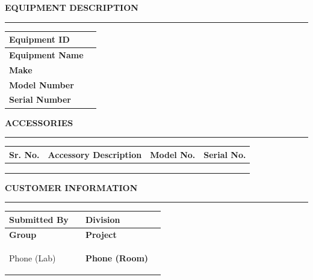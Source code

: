 \documentclass[a4paper,10pt]{article}
\newcommand{\sectiontitle}[1]
{
\vspace{2mm}

{\large\bfseries #1}

\vspace{0.5mm}

\hrule

\vspace{1.5mm}
}
\begin{document}
\sectiontitle{EQUIPMENT DESCRIPTION}

\begin{tabularx}{\textwidth}{|>{\bfseries}l|X|}
\hline
Equipment ID & \\[1mm]
\hline
Equipment Name & \\[1mm]
\hline
Make & \\[1mm]
\hline
Model Number & \\[1mm]
\hline
Serial Number & \\[1mm]
\hline
\end{tabularx}

\vspace{2mm}


\sectiontitle{ACCESSORIES}

\begin{tabularx}{\textwidth}
{|c|X|c|c|}
\hline

\textbf{Sr. No.} &
\textbf{Accessory Description} &
\textbf{Model No.} &
\textbf{Serial No.}
\\
\hline

& & & \\
\hline

& & & \\
\hline

& & & \\
\hline

\end{tabularx}

\vspace{2mm}


\sectiontitle{CUSTOMER INFORMATION}

\begin{tabularx}{\textwidth}{|>{\bfseries}l|X|>{\bfseries}l|X|}
\hline
Submitted By & &
Division &
\\
\hline

Group & &
Project &
\\
\hline

Phone (Lab) & &
Phone (Room) &
\\
\hline

\end{tabularx}

\vspace{2mm}
\end{document}
